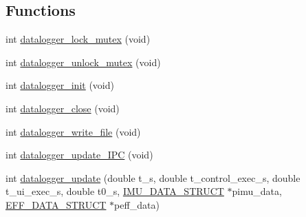\subsection*{Functions}
\begin{DoxyCompactItemize}
\item 
int \hyperlink{datalogger_01_07C_xC3_xB3pia_01em_01conflito_01de_01Andr_xC3_xA9_01Carvalho_012013-04-26_08_8c_a54b06d9395b2e370a5a72beb7f9524b2}{datalogger\-\_\-lock\-\_\-mutex} (void)
\item 
int \hyperlink{datalogger_01_07C_xC3_xB3pia_01em_01conflito_01de_01Andr_xC3_xA9_01Carvalho_012013-04-26_08_8c_a85453211c0c809083c36cc56b275aeeb}{datalogger\-\_\-unlock\-\_\-mutex} (void)
\item 
int \hyperlink{datalogger_01_07C_xC3_xB3pia_01em_01conflito_01de_01Andr_xC3_xA9_01Carvalho_012013-04-26_08_8c_a1977ef253746fd8c008a3641d9822551}{datalogger\-\_\-init} (void)
\item 
int \hyperlink{datalogger_01_07C_xC3_xB3pia_01em_01conflito_01de_01Andr_xC3_xA9_01Carvalho_012013-04-26_08_8c_ad22dbe9e235e7ae5737a23796d13ffbd}{datalogger\-\_\-close} (void)
\item 
int \hyperlink{datalogger_01_07C_xC3_xB3pia_01em_01conflito_01de_01Andr_xC3_xA9_01Carvalho_012013-04-26_08_8c_a2aedecfce53e1935a41615ceaf378013}{datalogger\-\_\-write\-\_\-file} (void)
\item 
int \hyperlink{datalogger_01_07C_xC3_xB3pia_01em_01conflito_01de_01Andr_xC3_xA9_01Carvalho_012013-04-26_08_8c_a25bb814a0877f419ae09b08cd7e91ee9}{datalogger\-\_\-update\-\_\-\-I\-P\-C} (void)
\item 
int \hyperlink{datalogger_01_07C_xC3_xB3pia_01em_01conflito_01de_01Andr_xC3_xA9_01Carvalho_012013-04-26_08_8c_ad7096326080dae8d80f5842297768fd8}{datalogger\-\_\-update} (double t\-\_\-s, double t\-\_\-control\-\_\-exec\-\_\-s, double t\-\_\-ui\-\_\-exec\-\_\-s, double t0\-\_\-s, \hyperlink{structIMU__DATA__STRUCT}{I\-M\-U\-\_\-\-D\-A\-T\-A\-\_\-\-S\-T\-R\-U\-C\-T} $\ast$pimu\-\_\-data, \hyperlink{structEFF__DATA__STRUCT}{E\-F\-F\-\_\-\-D\-A\-T\-A\-\_\-\-S\-T\-R\-U\-C\-T} $\ast$peff\-\_\-data)
\end{DoxyCompactItemize}
